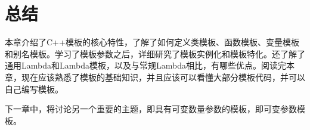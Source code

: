 \section{总结}
本章介绍了C++模板的核心特性，了解了如何定义类模板、函数模板、变量模板和别名模板。学习了模板参数之后，详细研究了模板实例化和模板特化。还了解了通用Lambda和Lambda模板，以及与常规Lambda相比，有哪些优点。阅读完本章，现在应该熟悉了模板的基础知识，并且应该可以看懂大部分模板代码，并可以自己编写模板。

下一章中，将讨论另一个重要的主题，即具有可变数量参数的模板，即可变参数模板。